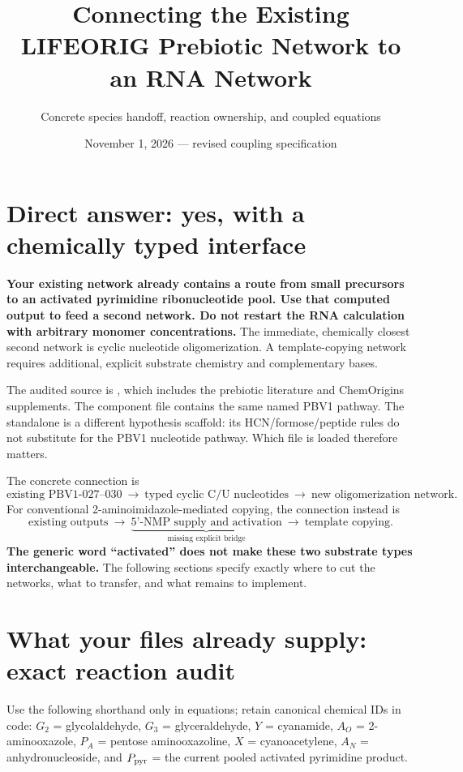 \documentclass[11pt]{article}
\title{Connecting the Existing LIFEORIG Prebiotic Network to an RNA Network}
\author{Concrete species handoff, reaction ownership, and coupled equations}
\date{November 1, 2026 --- revised coupling specification}
\begin{document}
\raggedbottom
\maketitle

\section{Direct answer: yes, with a chemically typed interface}
\textbf{Your existing network already contains a route from small precursors to
an activated pyrimidine ribonucleotide pool. Use that computed output to feed a
second network. Do not restart the RNA calculation with arbitrary monomer
concentrations.} The immediate, chemically closest second network is cyclic
nucleotide oligomerization. A template-copying network requires additional,
explicit substrate chemistry and complementary bases.

The audited source is
,
which includes the prebiotic literature and ChemOrigins supplements. The
component file
contains the same named PBV1 pathway. The standalone
 is a different hypothesis
scaffold: its HCN/formose/peptide rules do not substitute for the PBV1 nucleotide
pathway. Which file is loaded therefore matters.

The concrete connection is
\begin{equation}
\boxed{\text{existing PBV1-027--030}\ \longrightarrow\
\text{typed cyclic C/U nucleotides}\ \longrightarrow\
\text{new oligomerization network}.}
\end{equation}
For conventional 2-aminoimidazole-mediated copying, the connection instead is
\begin{equation}
\text{existing outputs}\ \longrightarrow\
\underbrace{\text{5'-NMP supply and activation}}_{\text{missing explicit bridge}}
\ \longrightarrow\ \text{template copying}.
\end{equation}
\textbf{The generic word ``activated'' does not make these two substrate types
interchangeable.} The following sections specify exactly where to cut the
networks, what to transfer, and what remains to implement.

\tableofcontents
\clearpage
\section{What your files already supply: exact reaction audit}
Use the following shorthand only in equations; retain canonical chemical IDs in
code: $G_2$ = glycolaldehyde, $G_3$ = glyceraldehyde, $Y$ = cyanamide,
$A_O$ = 2-aminooxazole, $P_A$ = pentose aminooxazoline,
$X$ = cyanoacetylene, $A_N$ = anhydronucleoside, and
$P_{\rm pyr}$ = the current pooled activated pyrimidine product.
\end{document}
